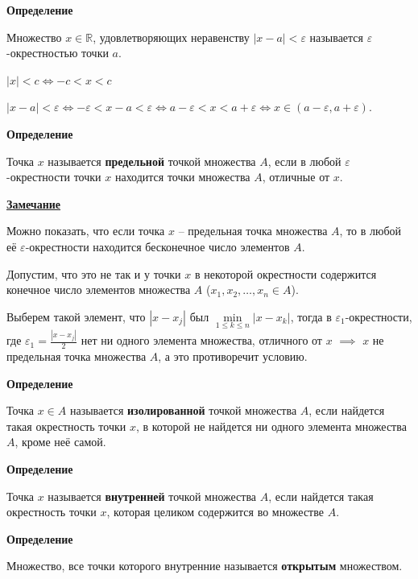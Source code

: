 \documentclass{article}
\newcommand{\parspace}{\vspace{10pt}}
\theoremstyle{break}
\begin{document}
\textbf{Определение}

Множество $x \in \mathbb{R}$, удовлетворяющих неравенству $|x - a| < \varepsilon$
называется $\varepsilon$-окрестностью точки $a$.

$|x| < c \Leftrightarrow -c < x < c$

$|x - a| < \varepsilon \Leftrightarrow -\varepsilon < x - a < \varepsilon \Leftrightarrow
a - \varepsilon < x < a + \varepsilon \Leftrightarrow x \in (a - \varepsilon, a + \varepsilon)$.

\parspace

\textbf{Определение}

Точка $x$ называется \textbf{предельной} точкой множества $A$, если в любой $\varepsilon$-окрестности
точки $x$ находится точки множества $A$, отличные от $x$.

\parspace

\underline{\textbf{Замечание}}

Можно показать, что если точка $x$ -- предельная точка множества $A$, то в любой её
$\varepsilon$-окрестности находится бесконечное число элементов $A$.

Допустим, что это не так и у точки $x$ в некоторой окрестности содержится конечное
число элементов множества $A$ ($x_1,x_2,\dots,x_n \in A$).

Выберем такой элемент, что $|x - x_j|$ был $\underset{1 \le k \le n}{\min} |x - x_k|$,
тогда в $\varepsilon_1$-окрестности, где $\varepsilon_1 = \frac{|x - x_j|}{2}$ нет ни
одного элемента множества, отличного от $x$ $\implies$ $x$ не предельная точка множества
$A$, а это противоречит условию.

\parspace

\textbf{Определение}

Точка $x \in A$ называется \textbf{изолированной} точкой множества $A$, если найдется такая
окрестность точки $x$, в которой не найдется ни одного элемента множества $A$,
кроме неё самой.

\parspace

\textbf{Определение}

Точка $x$ называется \textbf{внутренней} точкой множества $A$, если найдется такая
окрестность точки $x$, которая целиком содержится во множестве $A$.

\parspace

\textbf{Определение}

Множество, все точки которого внутренние называется \textbf{открытым} множеством.

\parspace
\end{document}
